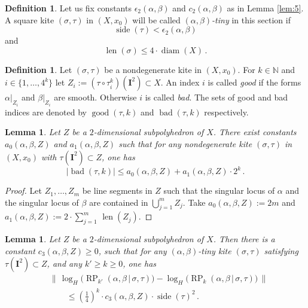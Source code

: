 \documentclass[10pt, a4paper]{amsart}
\newtheorem{lem}[equation]{Lemma}
\theoremstyle{definition}
\newtheorem{dfn}[equation]{Definition}
\numberwithin{equation}{section}
\newcommand{\opn}{\operatorname}
\newcommand{\mbf}[1]{\mathbf{#1}}
\newcommand{\mbb}[1]{\mathbb{#1}}
\newcommand{\smfrac}[2]{{\textstyle \frac{#1}{#2}}}
\newcommand{\Norm}[1]{\bigl\lVert\, #1 \, \bigr\rVert}
\newcommand{\abs}[1]{\lvert #1 \rvert}
\renewcommand{\vert}{\, | \,}
\newcommand{\N}{\mbb{N}}
\begin{document}
\begin{dfn}
Let us fix constants $\epsilon_2(\alpha, \beta)$ and
$c_2(\alpha, \beta)$ as in Lemma \ref{lem:5}.
A square kite $(\sigma, \tau)$ in $(X, x_0)$
will be called {\em $(\alpha, \beta)$-tiny} in this section if 
\[ \opn{side}(\tau) < \epsilon_2(\alpha, \beta) \]
and 
\[ \opn{len}(\sigma) \leq 4 \cdot \opn{diam}(X) \,  . \]
\end{dfn}

\begin{dfn} \label{dfn:45}
Let $(\sigma, \tau)$ be a nondegenerate kite in $(X, x_0)$. 
For $k \in \N$ and $i \in \{ 1, \ldots, 4^k \}$ let 
$Z_i := (\tau \circ \tau^k_i)(\mbf{I}^2) \subset X$. 
An index $i$ is called {\em good} if the forms
$\alpha|_{Z_i}$ and $\beta|_{Z_i}$ are smooth. Otherwise $i$ is called {\em
bad}. The sets of good and bad indices are denoted by 
$\opn{good}(\tau, k)$ and $\opn{bad}(\tau, k)$ respectively.
\end{dfn}

\begin{lem} \label{lem:51}
Let $Z$ be a $2$-dimensional subpolyhedron of $X$. There exist constants
$a_0(\alpha, \beta, Z)$ and $a_1(\alpha, \beta, Z)$ such that for any 
nondegenerate kite $(\sigma, \tau)$ in $(X, x_0)$ with 
$\tau(\mbf{I}^2) \subset Z$, one has
\[ \abs{ \opn{bad}(\tau, k) } \leq 
a_0(\alpha, \beta, Z) + a_1(\alpha, \beta, Z) \cdot 2^k \, . \]
\end{lem}

\begin{proof} 
Let $Z_1, \ldots, Z_m$ be line segments in $Z$ such that 
the singular locus of $\alpha$ and the singular locus of $\beta$ are
contained in $\bigcup_{j = 1}^m Z_j$. Take
$a_0(\alpha, \beta, Z) := 2 m$ and 
$a_1(\alpha, \beta, Z) := 2 \cdot \sum_{j = 1}^m \, \opn{len} (Z_j)$.
\end{proof}

\begin{lem} \label{lem:6}
Let $Z$ be a $2$-dimensional subpolyhedron of $X$.  Then there is a constant
$c_3(\alpha, \beta, Z) \geq 0$, such that for any 
$(\alpha, \beta)$-tiny kite $(\sigma, \tau)$ satisfying
$\tau(\mbf{I}^2) \subset Z$, and any $k' \geq k \geq 0$, one has
\[ \begin{aligned}
& \Norm{ \opn{log}_H \bigl( \opn{RP}_{k'}(\alpha, \beta \vert 
\sigma, \tau) \bigr) -
\opn{log}_H \bigl( \opn{RP}_{k}(\alpha, \beta \vert \sigma, \tau) \bigr) } \\
& \qquad \leq (\smfrac{1}{4})^k \cdot c_3(\alpha, \beta, Z) \cdot 
\opn{side}(\tau)^2  \, .
\end{aligned}  \]
\end{lem}
\end{document}
